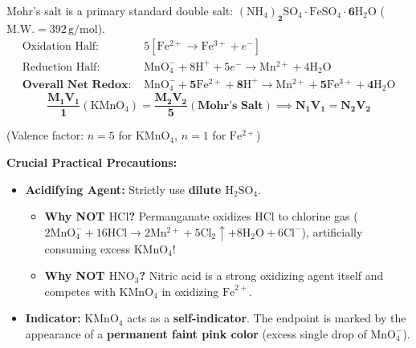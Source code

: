 \documentclass[10pt,twoside,openright]{book}
\begin{document}
\begin{formulabox}
Mohr's salt is a primary standard double salt: $\mathbf{(\mathrm{NH_4})_2\mathrm{SO_4}\cdot\mathrm{FeSO_4}\cdot 6\mathrm{H_2O}}$ ($\mathrm{M.W.} = 392\,\mathrm{g/mol}$).
\begin{align*}
  \text{Oxidation Half: } & 5[\mathrm{Fe^{2+}} \longrightarrow \mathrm{Fe^{3+}} + e^-]\\
  \text{Reduction Half: } & \mathrm{MnO_4^-} + 8\mathrm{H}^+ + 5e^- \longrightarrow \mathrm{Mn^{2+}} + 4\mathrm{H_2O}\\
  \textbf{Overall Net Redox: } & \mathbf{\mathrm{MnO_4^-} + 5\mathrm{Fe^{2+}} + 8\mathrm{H}^+ \longrightarrow \mathrm{Mn^{2+}} + 5\mathrm{Fe^{3+}} + 4\mathrm{H_2O}}
\end{align*}
\begin{equation}
  \mathbf{\frac{M_1 V_1}{1} (\mathrm{KMnO_4}) = \frac{M_2 V_2}{5} (\text{Mohr's Salt})} \implies \mathbf{N_1 V_1 = N_2 V_2}
\end{equation}
\centerline{\small (Valence factor: $n = 5$ for $\mathrm{KMnO_4}$, $n = 1$ for $\mathrm{Fe^{2+}}$)}

\textbf{Crucial Practical Precautions:}
\begin{itemize}
  \item \textbf{Acidifying Agent:} Strictly use \textbf{dilute $\mathrm{H_2SO_4}$}.
  \begin{itemize}
    \item \textbf{Why NOT $\mathrm{HCl}$?} Permanganate oxidizes $\mathrm{HCl}$ to chlorine gas ($2\mathrm{MnO_4^-} + 16\mathrm{HCl} \to 2\mathrm{Mn^{2+}} + 5\mathrm{Cl_2} \uparrow + 8\mathrm{H_2O} + 6\mathrm{Cl^-}$), artificially consuming excess $\mathrm{KMnO_4}$!
    \item \textbf{Why NOT $\mathrm{HNO}_3$?} Nitric acid is a strong oxidizing agent itself and competes with $\mathrm{KMnO_4}$ in oxidizing $\mathrm{Fe}^{2+}$.
  \end{itemize}
  \item \textbf{Indicator:} $\mathrm{KMnO_4}$ acts as a \textbf{self-indicator}. The endpoint is marked by the appearance of a \textbf{permanent faint pink color} (excess single drop of $\mathrm{MnO_4^-}$).
\end{itemize}
\end{formulabox}
\end{document}
